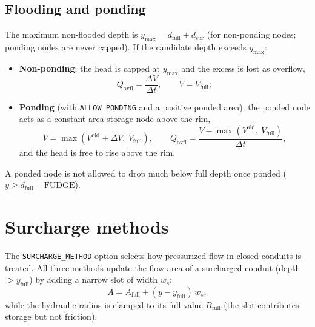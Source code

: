 \documentclass[11pt,a4paper]{article}
\begin{document}
\subsection{Flooding and ponding}

The maximum non-flooded depth is $y_{\max} = d_{\mathrm{full}} + d_{\mathrm{sur}}$
(for non-ponding nodes; ponding nodes are never capped). If the candidate depth
exceeds $y_{\max}$:
\begin{itemize}[nosep]
  \item \textbf{Non-ponding}: the head is capped at $y_{\max}$ and the excess is
        lost as overflow,
        \begin{equation}
          Q_{\mathrm{ovfl}} = \frac{\Delta V}{\Delta t}, \qquad
          V = V_{\mathrm{full}};
        \end{equation}
  \item \textbf{Ponding} (with \texttt{ALLOW\_PONDING} and a positive ponded
        area): the ponded node acts as a constant-area storage node above the
        rim,
        \begin{equation}
          V = \max\left(V^{\mathrm{old}} + \Delta V,\ V_{\mathrm{full}}\right), \qquad
          Q_{\mathrm{ovfl}} = \frac{V - \max(V^{\mathrm{old}},\ V_{\mathrm{full}})}
            {\Delta t},
        \end{equation}
        and the head is free to rise above the rim.
\end{itemize}
A ponded node is not allowed to drop much below full depth once ponded
($y \ge d_{\mathrm{full}} - \mathrm{FUDGE}$).

\section{Surcharge methods}

The \texttt{SURCHARGE\_METHOD} option selects how pressurized flow in closed
conduits is treated. All three methods update the flow area of a surcharged
conduit (depth $> y_{\mathrm{full}}$) by adding a narrow slot of width $w_s$:
\begin{equation}
  A = A_{\mathrm{full}} + (y - y_{\mathrm{full}})\,w_s,
\end{equation}
while the hydraulic radius is clamped to its full value $R_{\mathrm{full}}$
(the slot contributes storage but not friction).
\end{document}
